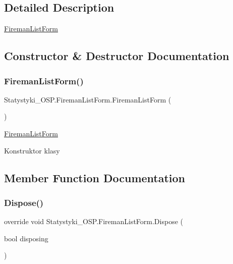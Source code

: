 \subsection{Detailed Description}
\mbox{\hyperlink{class_statystyki___o_s_p_1_1_fireman_list_form}{Fireman\+List\+Form}} 



\subsection{Constructor \& Destructor Documentation}
\mbox{\label{class_statystyki___o_s_p_1_1_fireman_list_form_a38107b6ae6fa4136207e7512a6650fc8}} 
\subsubsection{\texorpdfstring{FiremanListForm()}{FiremanListForm()}}
{\footnotesize\ttfamily Statystyki\+\_\+\+O\+S\+P.\+Fireman\+List\+Form.\+Fireman\+List\+Form (\begin{DoxyParamCaption}{ }\end{DoxyParamCaption})}



\mbox{\hyperlink{class_statystyki___o_s_p_1_1_fireman_list_form}{Fireman\+List\+Form}} 

Konstruktor klasy

\subsection{Member Function Documentation}
\mbox{\label{class_statystyki___o_s_p_1_1_fireman_list_form_a3dd2acec670d01d8e3af7bc9435efc54}} 
\subsubsection{\texorpdfstring{Dispose()}{Dispose()}}
{\footnotesize\ttfamily override void Statystyki\+\_\+\+O\+S\+P.\+Fireman\+List\+Form.\+Dispose (\begin{DoxyParamCaption}\item[{bool}]{disposing }\end{DoxyParamCaption})\hspace{0.3cm}{\ttfamily [protected]}}



